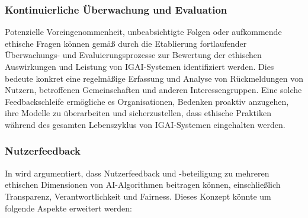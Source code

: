 \documentclass[12pt]{report}
\begin{document}
\subsubsection{Kontinuierliche Überwachung und Evaluation}
Potenzielle Voreingenommenheit, unbeabsichtigte Folgen oder aufkommende ethische Fragen können gemäß \cite{EUCommision} durch die Etablierung fortlaufender Überwachungs- und Evaluierungsprozesse zur Bewertung der ethischen Auswirkungen und Leistung von IGAI-Systemen identifiziert werden. Dies bedeute konkret eine regelmäßige Erfassung und Analyse von Rückmeldungen von Nutzern, betroffenen Gemeinschaften und anderen Interessengruppen. Eine solche Feedbackschleife ermögliche es Organisationen, Bedenken proaktiv anzugehen, ihre Modelle zu überarbeiten und sicherzustellen, dass ethische Praktiken während des gesamten Lebenszyklus von IGAI-Systemen eingehalten werden.

\subsubsection{Nutzerfeedback}
In \cite[The ethics of algorithms: Mapping the debate]{Mittelstadt} wird argumentiert, dass Nutzerfeedback und -beteiligung zu mehreren ethischen Dimensionen von AI-Algorithmen beitragen können, einschließlich Transparenz, Verantwortlichkeit und Fairness. Dieses Konzept könnte um folgende Aspekte erweitert werden:
\end{document}
